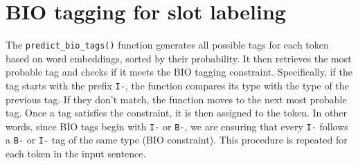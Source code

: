 \documentclass[11pt,a4paper]{article}
\begin{document}

    


\clearpage

\pagebreak
\section{BIO tagging for slot labeling}

The \texttt{predict\_bio\_tags()} function generates all possible tags for each token based on word embeddings, sorted by their probability. It then retrieves the most probable tag and checks if it meets the BIO tagging constraint. Specifically, if the tag starts with the prefix \texttt{I-}, the function compares its type with the type of the previous tag. If they don’t match, the function moves to the next most probable tag. Once a tag satisfies the constraint, it is then assigned to the token. In other words, since BIO tags begin with \texttt{I-} or \texttt{B-}, we are ensuring that every \texttt{I-} follows a \texttt{B-} or \texttt{I-} tag of the same type (BIO constraint).
This procedure is repeated for each token in the input sentence.
\end{document}
